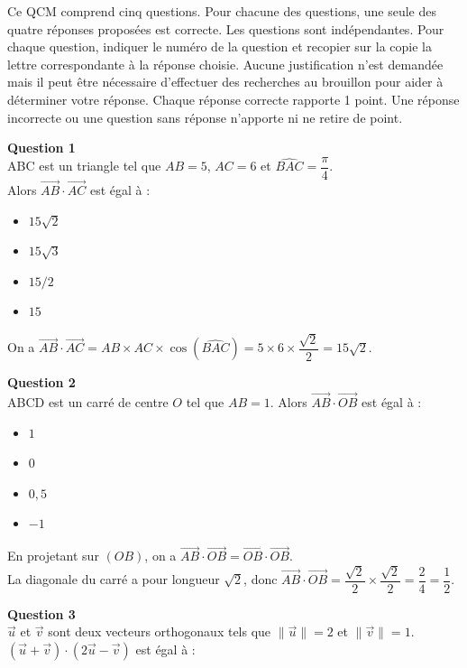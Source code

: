 Ce QCM comprend cinq questions. Pour chacune des questions, une seule des quatre réponses proposées est correcte. Les questions sont indépendantes. Pour chaque question, indiquer le numéro de la question et recopier sur la copie la lettre correspondante à la réponse choisie. Aucune justification n’est demandée mais il peut être nécessaire d’effectuer des recherches au brouillon pour aider à déterminer votre réponse. Chaque réponse correcte rapporte 1 point. Une réponse incorrecte ou une question sans réponse n’apporte ni ne retire de point.
	
\textbf{	Question 1}\\
	ABC est un triangle tel que $AB = 5$, $AC = 6$ et $\widehat{ BAC} = \dfrac{\pi}{4}$.\\
	 Alors $\overrightarrow{AB} \cdot \overrightarrow{AC}$ est égal à :
	
	\begin{itemize}
		\item[a.] $15\sqrt{2}$
		\item[b.] $15\sqrt{3}$
		\item[c.] $15/2$
		\item[d.] $15$
	\end{itemize}
	
	On a $\overrightarrow{AB} \cdot \overrightarrow{AC} = AB \times AC \times \cos(\widehat{ BAC}) = 5 \times 6 \times \dfrac{\sqrt{2}}{2} = 15\sqrt{2}$.
	
\textbf{	Question 2}\\
	ABCD est un carré de centre $O$ tel que $AB = 1$. Alors $\overrightarrow{AB} \cdot \overrightarrow{OB}$ est égal à :
	
	\begin{itemize}
		\item[a.] $1$
		\item[b.] $0$
		\item[c.] $0,5$
		\item[d.] $-1$
	\end{itemize}
	
	En projetant sur $(OB)$, on a $\overrightarrow{AB} \cdot \overrightarrow{OB} = \overrightarrow{OB} \cdot \overrightarrow{OB}$. \\
	La diagonale du carré a pour longueur $\sqrt{2}$, donc $\overrightarrow{AB} \cdot \overrightarrow{OB} = \dfrac{\sqrt{2}}{2} \times \dfrac{\sqrt{2}}{2} = \dfrac{2}{4} = \dfrac{1}{2}$.
	
	\textbf{{Question 3}}\\
	$\overrightarrow{u}$ et $\overrightarrow{v}$ sont deux vecteurs orthogonaux tels que $\|\overrightarrow{u}\| = 2$ et $\|\overrightarrow{v}\| = 1$. $(\overrightarrow{u} + \overrightarrow{v}) \cdot (2\overrightarrow{u} - \overrightarrow{v})$ est égal à :
	
